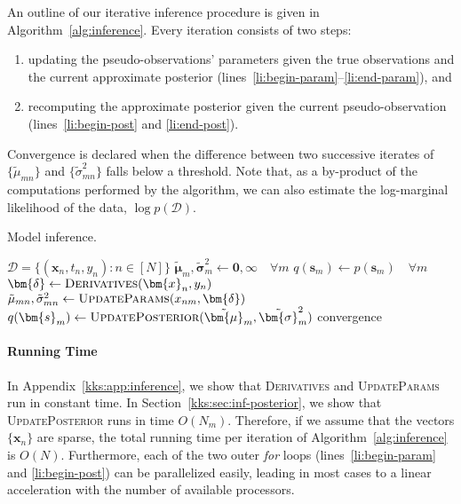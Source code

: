 An outline of our iterative inference procedure is given in Algorithm~\ref{alg:inference}.
Every iteration consists of two steps:
\begin{enumerate}
	\item updating the pseudo-observations' parameters given the true observations and the current approximate posterior (lines~\ref{li:begin-param}--\ref{li:end-param}), and
	\item recomputing the approximate posterior given the current pseudo-observation (lines~\ref{li:begin-post} and \ref{li:end-post}).
\end{enumerate}
Convergence is declared when the difference between two successive iterates of $\{ \tilde{\mu}_{mn} \}$ and $\{ \tilde{\sigma}_{mn}^2 \}$ falls below a threshold.
Note that, as a by-product of the computations performed by the algorithm, we can also estimate the log-marginal likelihood of the data, $\log p(\mathcal{D})$.

\begin{algorithm}[t]
	\caption{Model inference.}
	\label{alg:inference}
	\begin{algorithmic}[1]
		\Require $\mathcal{D} = \{ (\bm{x}_n, t_n, y_n) : n \in [N] \}$
		\State $\tilde{\bm{\mu}}_m, \tilde{\bm{\sigma}}^2_m \gets \bm{0}, \bm{\infty} \quad \forall m$
		\State $q(\bm{s}_m) \gets p(\bm{s}_m) \quad \forall m$
		\Repeat
		  \label{li:begin-param}
		\State $\bm{\delta} \gets \textsc{Derivatives}(\bm{x}_n, y_n)$ \label{li:derivatives}
		\State $\tilde{\mu}_{mn}, \tilde{\sigma}^2_{mn} \gets \textsc{UpdateParams}(x_{nm}, \bm{\delta})$ \label{li:updateparams}
		\EndFor
		\EndFor \label{li:end-param}
		 \label{li:begin-post}
		\State $q(\bm{s}_m) \gets \textsc{UpdatePosterior}(\tilde{\bm{\mu}}_m, \tilde{\bm{\sigma}}^2_m)$ \label{li:updateposterior}
		\EndFor \label{li:end-post}
		\Until convergence
	\end{algorithmic}
\end{algorithm}

\paragraph{Running Time}
In Appendix~\ref{kks:app:inference}, we show that \textsc{Derivatives} and \textsc{UpdateParams} run in constant time.
In Section~\ref{kks:sec:inf-posterior}, we show that \textsc{UpdatePosterior} runs in time $O(N_m)$.
Therefore, if we assume that the vectors $\{ \bm{x}_n \}$ are sparse, the total running time per iteration of Algorithm~\ref{alg:inference} is $O(N)$.
Furthermore, each of the two outer \emph{for} loops (lines~\ref{li:begin-param} and \ref{li:begin-post}) can be parallelized easily, leading in most cases to a linear acceleration with the number of available processors.


